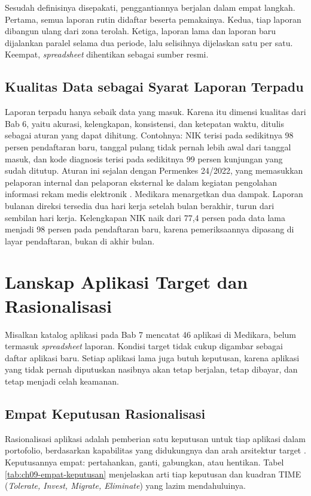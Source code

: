 Sesudah definisinya disepakati, penggantiannya berjalan dalam empat langkah.
Pertama, semua laporan rutin didaftar beserta pemakainya. Kedua, tiap laporan
dibangun ulang dari zona terolah. Ketiga, laporan lama dan laporan baru
dijalankan paralel selama dua periode, lalu selisihnya dijelaskan satu per
satu. Keempat, \textit{spreadsheet} dihentikan sebagai sumber resmi.

\subsection*{Kualitas Data sebagai Syarat Laporan Terpadu}

Laporan terpadu hanya sebaik data yang masuk. Karena itu dimensi kualitas dari
Bab 6, yaitu akurasi, kelengkapan, konsistensi, dan ketepatan waktu, ditulis
sebagai aturan yang dapat dihitung. Contohnya: NIK terisi pada sedikitnya 98
persen pendaftaran baru, tanggal pulang tidak pernah lebih awal dari tanggal
masuk, dan kode diagnosis terisi pada sedikitnya 99 persen kunjungan yang sudah
ditutup. Aturan ini sejalan dengan Permenkes 24/2022, yang memasukkan
pelaporan internal dan pelaporan eksternal ke dalam kegiatan pengolahan
informasi rekam medis elektronik \cite{permenkes24-2022}. Medikara
menargetkan dua dampak. Laporan bulanan direksi tersedia dua hari kerja
setelah bulan berakhir, turun dari sembilan hari kerja. Kelengkapan NIK naik
dari 77,4 persen pada data lama menjadi 98 persen pada pendaftaran baru,
karena pemeriksaannya dipasang di layar pendaftaran, bukan di akhir bulan.

\section{Lanskap Aplikasi Target dan Rasionalisasi}

Misalkan katalog aplikasi pada Bab 7 mencatat 46 aplikasi di Medikara, belum
termasuk \textit{spreadsheet} laporan. Kondisi target tidak cukup digambar sebagai
daftar aplikasi baru. Setiap aplikasi lama juga butuh keputusan, karena
aplikasi yang tidak pernah diputuskan nasibnya akan tetap berjalan, tetap
dibayar, dan tetap menjadi celah keamanan.

\subsection*{Empat Keputusan Rasionalisasi}

Rasionalisasi aplikasi adalah pemberian satu keputusan untuk tiap aplikasi
dalam portofolio, berdasarkan kapabilitas yang didukungnya dan arah
arsitektur target \cite{bizbok15}. Keputusannya empat: pertahankan, ganti,
gabungkan, atau hentikan. Tabel \ref{tab:ch09-empat-keputusan} menjelaskan
arti tiap keputusan dan kuadran TIME (\textit{Tolerate, Invest, Migrate,
Eliminate}) yang lazim mendahuluinya.

